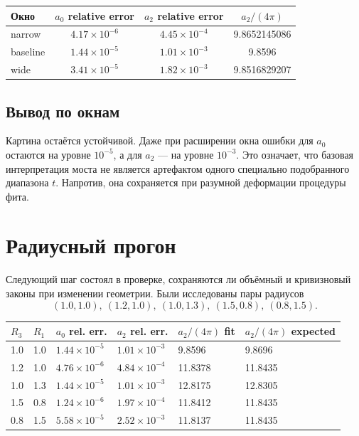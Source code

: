 \documentclass[12pt,a4paper]{article}
\begin{document}
\begin{center}
\begin{tabular}{lccc}
\toprule
Окно & $a_0$ relative error & $a_2$ relative error & $a_2/(4\pi)$ \\
\midrule
narrow & $4.17\times 10^{-6}$ & $4.45\times 10^{-4}$ & 9.8652145086 \\
baseline & $1.44\times 10^{-5}$ & $1.01\times 10^{-3}$ & 9.8596 \\
wide & $3.41\times 10^{-5}$ & $1.82\times 10^{-3}$ & 9.8516829207 \\
\bottomrule
\end{tabular}
\end{center}

\subsection{Вывод по окнам}

Картина остаётся устойчивой. Даже при расширении окна ошибки для \(a_0\) остаются на уровне \(10^{-5}\), а для \(a_2\) --- на уровне \(10^{-3}\). Это означает, что базовая интерпретация моста не является артефактом одного специально подобранного диапазона \(t\). Напротив, она сохраняется при разумной деформации процедуры фита.

\section{Радиусный прогон}

Следующий шаг состоял в проверке, сохраняются ли объёмный и кривизновый законы при изменении геометрии. Были исследованы пары радиусов
\[
(1.0,1.0),\ (1.2,1.0),\ (1.0,1.3),\ (1.5,0.8),\ (0.8,1.5).
\]

\begin{longtable}{p{2.2cm}p{2.2cm}p{2.5cm}p{2.5cm}p{2.3cm}p{2.3cm}}
\toprule
$R_3$ & $R_1$ & $a_0$ rel. err. & $a_2$ rel. err. & $a_2/(4\pi)$ fit & $a_2/(4\pi)$ expected \\
\midrule
\endhead
1.0 & 1.0 & $1.44\times 10^{-5}$ & $1.01\times 10^{-3}$ & 9.8596 & 9.8696 \\
1.2 & 1.0 & $4.76\times 10^{-6}$ & $4.84\times 10^{-4}$ & 11.8378 & 11.8435 \\
1.0 & 1.3 & $1.44\times 10^{-5}$ & $1.01\times 10^{-3}$ & 12.8175 & 12.8305 \\
1.5 & 0.8 & $1.24\times 10^{-6}$ & $1.97\times 10^{-4}$ & 11.8412 & 11.8435 \\
0.8 & 1.5 & $5.58\times 10^{-5}$ & $2.52\times 10^{-3}$ & 11.8137 & 11.8435 \\
\bottomrule
\end{longtable}
\end{document}
